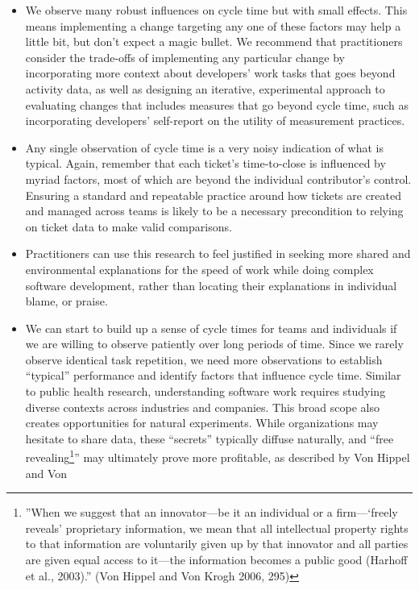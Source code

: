 \documentclass[
]{article}
\providecommand{\tightlist}{%
  \setlength{\itemsep}{0pt}\setlength{\parskip}{0pt}}\usepackage{longtable,booktabs,array}
\begin{document}
\begin{itemize}
\tightlist
\item
  We observe many robust influences on cycle time but with small
  effects. This means implementing a change targeting any one of these
  factors may help a little bit, but don't expect a magic bullet. We
  recommend that practitioners consider the trade-offs of implementing
  any particular change by incorporating more context about developers'
  work tasks that goes beyond activity data, as well as designing an
  iterative, experimental approach to evaluating changes that includes
  measures that go beyond cycle time, such as incorporating developers'
  self-report on the utility of measurement practices.
\item
  Any single observation of cycle time is a very noisy indication of
  what is typical. Again, remember that each ticket's time-to-close is
  influenced by myriad factors, most of which are beyond the individual
  contributor's control. Ensuring a standard and repeatable practice
  around how tickets are created and managed across teams is likely to
  be a necessary precondition to relying on ticket data to make valid
  comparisons.
\item
  Practitioners can use this research to feel justified in seeking more
  shared and environmental explanations for the speed of work while
  doing complex software development, rather than locating their
  explanations in individual blame, or praise.
\item
  We can start to build up a sense of cycle times for teams and
  individuals if we are willing to observe patiently over long periods
  of time. Since we rarely observe identical task repetition, we need
  more observations to establish ``typical'' performance and identify
  factors that influence cycle time. Similar to public health research,
  understanding software work requires studying diverse contexts across
  industries and companies. This broad scope also creates opportunities
  for natural experiments. While organizations may hesitate to share
  data, these ``secrets'' typically diffuse naturally, and ``free
  revealing\footnote{''When we suggest that an innovator---be it an
    individual or a firm---`freely reveals' proprietary information, we
    mean that all intellectual property rights to that information are
    voluntarily given up by that innovator and all parties are given
    equal access to it---the information becomes a public good (Harhoff
    et al., 2003).'' (Von Hippel and Von Krogh 2006, 295)}'' may
  ultimately prove more profitable, as described by Von Hippel and Von

\end{itemize}
\end{document}
